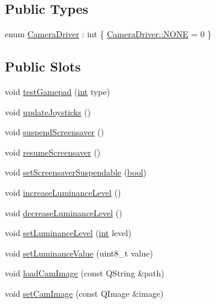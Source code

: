 \subsection*{Public Types}
\begin{DoxyCompactItemize}
\item 
enum \mbox{\hyperlink{class_q_g_b_a_1_1_input_controller_af93ed1b611844d8b6cb4bc9c593b816e}{Camera\+Driver}} \+: int \{ \mbox{\hyperlink{class_q_g_b_a_1_1_input_controller_af93ed1b611844d8b6cb4bc9c593b816eab50339a10e1de285ac99d4c3990b8693}{Camera\+Driver\+::\+N\+O\+NE}} = 0
 \}
\end{DoxyCompactItemize}
\subsection*{Public Slots}
\begin{DoxyCompactItemize}
\item 
void \mbox{\hyperlink{class_q_g_b_a_1_1_input_controller_abd049f5661c769b2d4981b0a28e95221}{test\+Gamepad}} (\mbox{\hyperlink{ioapi_8h_a787fa3cf048117ba7123753c1e74fcd6}{int}} type)
\item 
void \mbox{\hyperlink{class_q_g_b_a_1_1_input_controller_aa8a9042a903f7e1204b1207ecdcb0f73}{update\+Joysticks}} ()
\item 
void \mbox{\hyperlink{class_q_g_b_a_1_1_input_controller_a4386bdf93be039e66f99b3f92d248971}{suspend\+Screensaver}} ()
\item 
void \mbox{\hyperlink{class_q_g_b_a_1_1_input_controller_afc0f0a7619fca7bb6a7afa073c7fb19a}{resume\+Screensaver}} ()
\item 
void \mbox{\hyperlink{class_q_g_b_a_1_1_input_controller_aa09db1d4f2f488a78dfc27899d087094}{set\+Screensaver\+Suspendable}} (\mbox{\hyperlink{libretro_8h_a4a26dcae73fb7e1528214a068aca317e}{bool}})
\item 
void \mbox{\hyperlink{class_q_g_b_a_1_1_input_controller_a0d9d6daa47b8b5d18f22d250d253e228}{increase\+Luminance\+Level}} ()
\item 
void \mbox{\hyperlink{class_q_g_b_a_1_1_input_controller_a774ccf527bcb6167c25259b8ace0483f}{decrease\+Luminance\+Level}} ()
\item 
void \mbox{\hyperlink{class_q_g_b_a_1_1_input_controller_a2fc1c459b9c0d22e2222e766be1ec65f}{set\+Luminance\+Level}} (\mbox{\hyperlink{ioapi_8h_a787fa3cf048117ba7123753c1e74fcd6}{int}} level)
\item 
void \mbox{\hyperlink{class_q_g_b_a_1_1_input_controller_af4565a7e323e79cc1c75a9d04b8df989}{set\+Luminance\+Value}} (uint8\+\_\+t value)
\item 
void \mbox{\hyperlink{class_q_g_b_a_1_1_input_controller_aee5be199d0effc2fd468611bdc9a9ef5}{load\+Cam\+Image}} (const Q\+String \&path)
\item 
void \mbox{\hyperlink{class_q_g_b_a_1_1_input_controller_a61728418639adc71f4ab08fa89720852}{set\+Cam\+Image}} (const Q\+Image \&image)
\end{DoxyCompactItemize}
